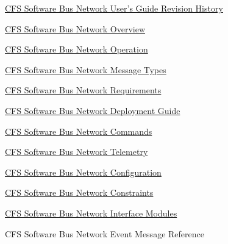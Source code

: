 
\begin{DoxyItemize}
\item \hyperlink{cfssbnrevhist}{C\-F\-S Software Bus Network User's Guide Revision History} 
\item \hyperlink{cfssbnovr}{C\-F\-S Software Bus Network Overview} 
\item \hyperlink{cfssbnopr}{C\-F\-S Software Bus Network Operation} 
\item \hyperlink{cfssbnmsgs}{C\-F\-S Software Bus Network Message Types} 
\item \hyperlink{cfssbnreq}{C\-F\-S Software Bus Network Requirements} 
\item \hyperlink{cfssbndg}{C\-F\-S Software Bus Network Deployment Guide} 
\item \hyperlink{cfssbncmds}{C\-F\-S Software Bus Network Commands} 
\item \hyperlink{cfssbntlm}{C\-F\-S Software Bus Network Telemetry} 
\item \hyperlink{cfssbncfg}{C\-F\-S Software Bus Network Configuration} 
\item \hyperlink{cfssbncons}{C\-F\-S Software Bus Network Constraints} 
\item \hyperlink{cfssbnmod}{C\-F\-S Software Bus Network Interface Modules} 
\item C\-F\-S Software Bus Network Event Message Reference \par
 
\end{DoxyItemize}